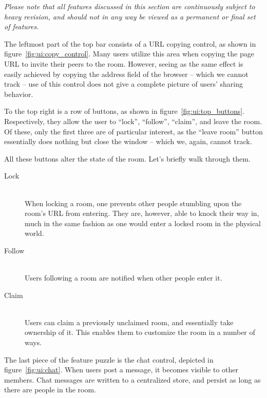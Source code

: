 \emph{Please note that all features discussed in this section are continuously subject to heavy revision, and should not in any way be viewed as a permanent or final set of features.}

The leftmost part of the top bar consists of a URL copying control, as shown in figure~\ref{fig:ui:copy_control}. Many users utilize this area when copying the page URL to invite their peers to the room. However, seeing as the same effect is easily achieved by copying the address field of the browser -- which we cannot track -- use of this control does not give a complete picture of users' sharing behavior.

To the top right is a row of buttons, as shown in figure~\ref{fig:ui:top_buttons}. Respectively, they allow the user to ``lock'', ``follow'', ``claim'', and leave the room. Of these, only the first three are of particular interest, as the ``leave room'' button essentially does nothing but close the window -- which we, again, cannot track.

All these buttons alter the state of the room. Let's briefly walk through them.

\begin{description}
  \item[Lock] \hfill \\
    When locking a room, one prevents other people stumbling upon the room's URL from entering. They are, however, able to knock their way in, much in the same fashion as one would enter a locked room in the physical world.
  \item[Follow] \hfill \\
    Users following a room are notified when other people enter it.
  \item[Claim] \hfill \\
    Users can claim a previously unclaimed room, and essentially take ownership of it. This enables them to customize the room in a number of ways.
\end{description}

The last piece of the feature puzzle is the chat control, depicted in figure~\ref{fig:ui:chat}. When users post a message, it becomes visible to other members. Chat messages are written to a centralized store, and persist as long as there are people in the room.

